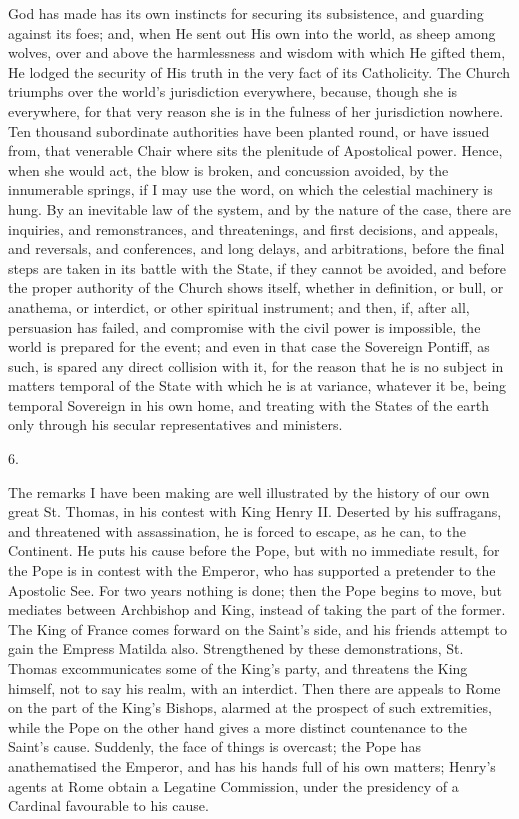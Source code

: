 God has made has its own instincts for securing its subsistence, and
guarding against its foes; and, when He sent out His own into the
world, as sheep among wolves, over and above the harmlessness and
wisdom with which He gifted them, He lodged the security of His truth
in the very fact of its Catholicity. The Church triumphs over the
world's jurisdiction everywhere, because, though she is everywhere,
for that very reason she is in the fulness of her jurisdiction
nowhere. Ten thousand subordinate authorities have been planted round,
or have issued from, that venerable Chair where sits the plenitude of
Apostolical power. Hence, when she would act, the blow is broken, and
concussion avoided, by the innumerable springs, if I may use the word,
on which the celestial machinery is hung. By an inevitable law of the
system, and by the nature of the case, there are inquiries, and
remonstrances, and threatenings, and first decisions, and appeals, and
reversals, and conferences, and long delays, and arbitrations, before
the final steps are taken in its battle with the State, if they cannot
be avoided, and before the proper authority of the Church shows
itself, whether in definition, or bull, or anathema, or interdict, or
other spiritual instrument; and then, if, after all, persuasion has
failed, and compromise with the civil power is impossible, the world
is prepared for the event; and even in that case the Sovereign
Pontiff, as such, is spared any direct collision with it, for the
reason that he is no subject in matters temporal of the State with
which he is at variance, whatever it be, being temporal Sovereign in
his own home, and treating with the States of the earth only through
his secular representatives and ministers.

6.

The remarks I have been making are well illustrated by the history
of our own great St. Thomas, in his contest with King Henry II.
Deserted by his suffragans, and threatened with assassination, he is
forced to escape, as he can, to the Continent. He puts his cause
before the Pope, but with no immediate result, for the Pope is in
contest with the Emperor, who has supported a pretender to the
Apostolic See. For two years nothing is done; then the Pope begins to
move, but mediates between Archbishop and King, instead of taking the
part of the former. The King of France comes forward on the Saint's
side, and his friends attempt to gain the Empress Matilda also.
Strengthened by these demonstrations, St. Thomas excommunicates some
of the King's party, and threatens the King himself, not to say his
realm, with an interdict. Then there are appeals to Rome on the part
of the King's Bishops, alarmed at the prospect of such extremities,
while the Pope on the other hand gives a more distinct countenance to
the Saint's cause. Suddenly, the face of things is overcast; the Pope
has anathematised the Emperor, and has his hands full of his own
matters; Henry's agents at Rome obtain a Legatine Commission, under
the presidency of a Cardinal favourable to his cause.


